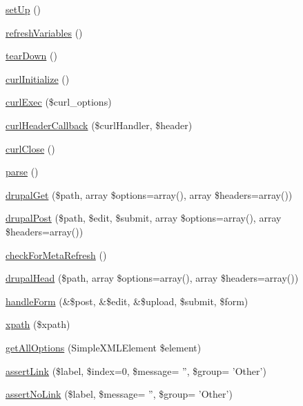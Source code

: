 \begin{DoxyCompactItemize}
\item 
\hyperlink{class_drupal_web_test_case_a110ecf5deb57ee6a908617360c1f6ec4}{setUp} ()
\item 
\hyperlink{class_drupal_web_test_case_ad82b8c5cdc60fb19c9550ab7ba3fd017}{refreshVariables} ()
\item 
\hyperlink{class_drupal_web_test_case_a6c0dba3c89c4aab3fa2576857c6f2be1}{tearDown} ()
\item 
\hyperlink{class_drupal_web_test_case_a8c51d47f5b89aad9f5e7fc4fa001bf05}{curlInitialize} ()
\item 
\hyperlink{class_drupal_web_test_case_aa559e47572bc90f0c8ccd1aef86fd95f}{curlExec} (\$curl\_\-options)
\item 
\hyperlink{class_drupal_web_test_case_a7993c14e1d81d759a6b3903764bb0e46}{curlHeaderCallback} (\$curlHandler, \$header)
\item 
\hyperlink{class_drupal_web_test_case_a0b3eb01ee1312ea28f78fc1a293835be}{curlClose} ()
\item 
\hyperlink{class_drupal_web_test_case_a19289cdf27c85cad8e10960769d1e28b}{parse} ()
\item 
\hyperlink{class_drupal_web_test_case_ae282e9e10195fb8dad8a49d1b35e31c9}{drupalGet} (\$path, array \$options=array(), array \$headers=array())
\item 
\hyperlink{class_drupal_web_test_case_aa773e6bf6ff8d0085dc60fb6d9ba888e}{drupalPost} (\$path, \$edit, \$submit, array \$options=array(), array \$headers=array())
\item 
\hyperlink{class_drupal_web_test_case_a639bf5d4e0892c7d3659c224a609183c}{checkForMetaRefresh} ()
\item 
\hyperlink{class_drupal_web_test_case_adfed12ec9ae7e71a0de659894d5b171d}{drupalHead} (\$path, array \$options=array(), array \$headers=array())
\item 
\hyperlink{class_drupal_web_test_case_af28fa56d6175e845d39c2db518544633}{handleForm} (\&\$post, \&\$edit, \&\$upload, \$submit, \$form)
\item 
\hyperlink{class_drupal_web_test_case_a6442bac68174cd9c13277515573728e9}{xpath} (\$xpath)
\item 
\hyperlink{class_drupal_web_test_case_a242a13b4aaf558f5b4030c0ad2b3789c}{getAllOptions} (SimpleXMLElement \$element)
\item 
\hyperlink{class_drupal_web_test_case_aa78cd0d7454235fcad55aaf14a77ed40}{assertLink} (\$label, \$index=0, \$message= '', \$group= 'Other')
\item 
\hyperlink{class_drupal_web_test_case_aebe9c02edc5edcf8e0b97d5c9742070b}{assertNoLink} (\$label, \$message= '', \$group= 'Other')

\end{DoxyCompactItemize}
